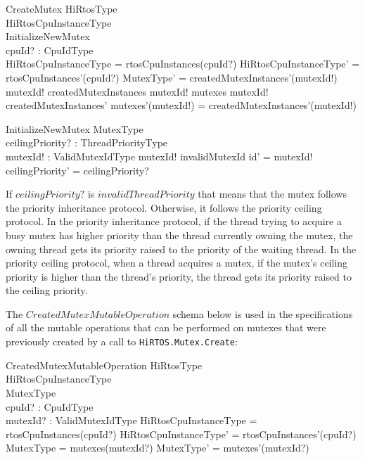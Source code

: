 \documentclass[11pt,letterpaper,twoside,openany]{book}
\begin{document}
\begin{schema}{CreateMutex}
   \Delta HiRtosType \\
   \Delta HiRtosCpuInstanceType \\
   InitializeNewMutex \\
   cpuId? : CpuIdType \\
\where
   \theta HiRtosCpuInstanceType = rtosCpuInstances(cpuId?)
\also
   \theta HiRtosCpuInstanceType' = rtosCpuInstances'(cpuId?)
\also
   \theta MutexType' = createdMutexInstances'(mutexId!)
\also
   mutexId! \notin \dom createdMutexInstances
\also
   mutexId! \notin \dom mutexes
\also
   mutexId! \in \dom createdMutexInstances'
\also
   mutexes'(mutexId!) = createdMutexInstances'(mutexId!)
\end{schema}

\begin{schema}{InitializeNewMutex}
   \Delta MutexType \\
   ceilingPriority? : ThreadPriorityType \\
   mutexId! : ValidMutexIdType
\where
   mutexId! \neq invalidMutexId
\also
   id' = mutexId!
\also
   ceilingPriority' = ceilingPriority?
\end{schema}

If $ceilingPriority?$ is $invalidThreadPriority$ that means that the mutex follows the priority
inheritance protocol. Otherwise, it follows the priority ceiling protocol. In the priority inheritance
protocol, if the thread trying to acquire a busy mutex has higher priority than the thread currently
owning the mutex, the owning thread gets its priority raised to the priority of the waiting thread.
In the priority ceiling protocol, when a thread acquires a mutex, if the mutex's ceiling priority is
higher than the thread's priority, the thread gets its priority raised to the ceiling priority.

The $CreatedMutexMutableOperation$ schema below is used in the specifications of all the mutable
operations that can be performed on mutexes that were previously created by a call to
\verb'HiRTOS.Mutex.Create':

\begin{schema}{CreatedMutexMutableOperation}
   \Delta HiRtosType \\
   \Delta HiRtosCpuInstanceType \\
   \Delta MutexType \\
   cpuId? : CpuIdType \\
   mutexId? : ValidMutexIdType
\where
   \theta HiRtosCpuInstanceType = rtosCpuInstances(cpuId?)
\also
   \theta HiRtosCpuInstanceType' = rtosCpuInstances'(cpuId?)
\also
   \theta MutexType = mutexes(mutexId?)
\also
   \theta MutexType' = mutexes'(mutexId?)
\end{schema}
\end{document}
